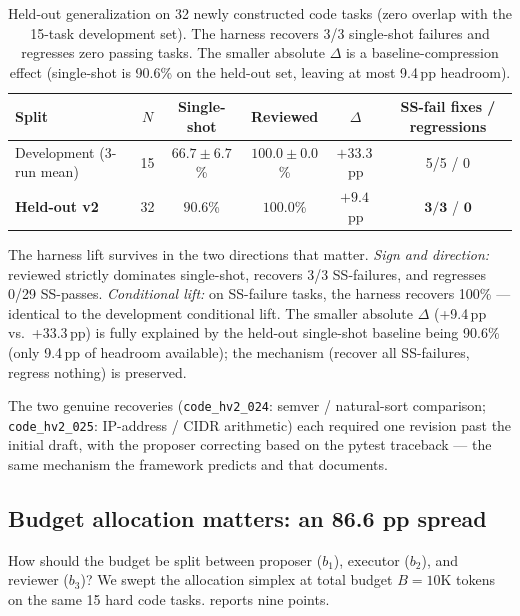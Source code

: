 \documentclass[11pt]{article}
\begin{document}
\begin{table}[ht]
\centering
\caption{Held-out generalization on 32 newly constructed code tasks (zero overlap with the 15-task development set). The harness recovers 3/3 single-shot failures and regresses zero passing tasks. The smaller absolute $\Delta$ is a baseline-compression effect (single-shot is 90.6\% on the held-out set, leaving at most 9.4\,pp headroom).}
\label{tab:heldout}
\small
\begin{tabular}{lccccc}
\toprule
Split & $N$ & Single-shot & Reviewed & $\Delta$ & SS-fail fixes / regressions \\
\midrule
Development (3-run mean) & 15 & $66.7 \pm 6.7$\% & $100.0 \pm 0.0$\% & $+33.3$\,pp & 5/5 / 0 \\
\textbf{Held-out v2}     & 32 & $90.6$\% & $\mathbf{100.0}$\% & $\mathbf{+9.4}$\,pp & $\mathbf{3/3}$ / $\mathbf{0}$ \\
\bottomrule
\end{tabular}
\end{table}

The harness lift survives in the two directions that matter. \emph{Sign and direction:} reviewed strictly dominates single-shot, recovers 3/3 SS-failures, and regresses 0/29 SS-passes. \emph{Conditional lift:} on SS-failure tasks, the harness recovers 100\% --- identical to the development conditional lift. The smaller absolute $\Delta$ (+9.4\,pp vs.\ +33.3\,pp) is fully explained by the held-out single-shot baseline being 90.6\% (only 9.4\,pp of headroom available); the mechanism (recover all SS-failures, regress nothing) is preserved.

The two genuine recoveries (\texttt{code\_hv2\_024}: semver / natural-sort comparison; \texttt{code\_hv2\_025}: IP-address / CIDR arithmetic) each required one revision past the initial draft, with the proposer correcting based on the pytest traceback --- the same mechanism the framework predicts and that  documents.

\subsection{Budget allocation matters: an 86.6 pp spread}
\label{sec:harness-allocation}

How should the budget be split between proposer ($b_1$), executor ($b_2$), and reviewer ($b_3$)? We swept the allocation simplex at total budget $B = 10$K tokens on the same 15 hard code tasks.  reports nine points.
\end{document}
